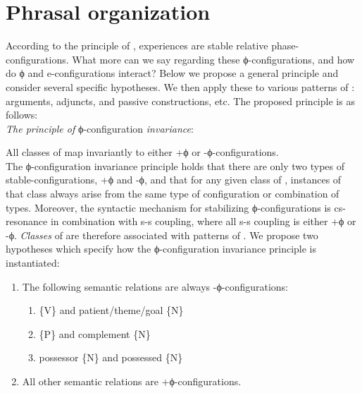 \section{Phrasal organization}

According to the principle of ,  experiences are stable relative phase-configurations. What more can we say regarding these ϕ-configurations, and how do ϕ and e-configurations interact? Below we propose a general principle and consider several specific hypotheses. We then apply these to various patterns of : arguments, adjuncts,  and passive constructions, etc. The proposed principle is as follows:\\

\noindent\textit{The principle of} ϕ-configuration \textit{invariance}: 

\noindent All classes of  map invariantly to either +ϕ or -ϕ-con\-fig\-u\-ra\-tions. \\

  The ϕ-configuration invariance principle holds that there are only two types of stable-configurations, +ϕ and -ϕ, and that for any given class of , instances of that class always arise from the same type of configuration or combination of types. Moreover, the syntactic mechanism for stabilizing ϕ-configurations is cs-resonance in combination with s-s coupling, where all s-s coupling is either +ϕ or -ϕ. \textit{Classes} of  are therefore associated with patterns of . We propose two hypotheses which specify how the ϕ-configuration invariance principle is instantiated:
  
\begin{enumerate}
\item The following semantic relations are always -ϕ-configurations:
\begin{enumerate}
  \item \{V\} and patient/theme/goal \{N\}
  \item {} \{P\} and complement \{N\}
  \item possessor \{N\} and possessed \{N\}
\end{enumerate}
\item  All other semantic relations are +ϕ-configurations.
\end{enumerate}

